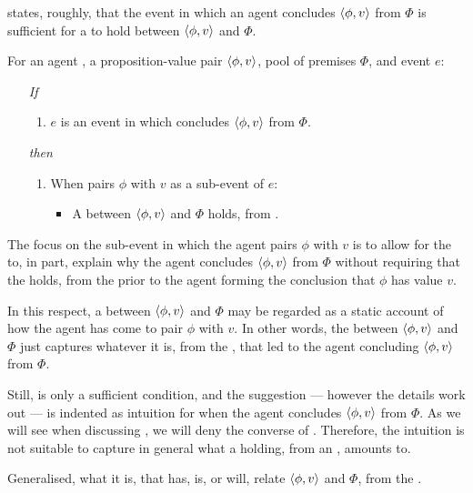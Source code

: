 \begin{note}
  \supportI{} states, roughly, that the event in which an agent concludes \(\langle \phi, v \rangle\) from \(\Phi\) is sufficient for a \ros{} to hold between \(\langle \phi, v \rangle\) and \(\Phi\).

  \begin{idea}[\supportI{}]
    \label{idea:support}
    For an agent \vAgent{}, a proposition-value pair \(\langle \phi, v \rangle\), pool of premises \(\Phi\), and event \(e\):

    \begin{itemize}
    \item[\emph{If}]
      \begin{enumerate}[label=\alph*., ref=(\alph*)]
      \item
        \(e\) is an event in which \vAgent{} concludes \(\langle \phi, v \rangle\) from \(\Phi\).
      \end{enumerate}
    \item[\emph{then}]
      \begin{enumerate}[label=\alph*., ref=(\alph*), resume]
      \item
        When \vAgent{} pairs \(\phi\) with \(v\) as a sub-event of \(e\):
        \begin{itemize}
        \item
          A \emph{\ros{}} between \(\langle \phi, v \rangle\) and \(\Phi\) holds, from .
        \end{itemize}
      \end{enumerate}
    \end{itemize}
    \vspace{-\baselineskip}
  \end{idea}

  The focus on the sub-event in which the agent pairs \(\phi\) with \(v\) is to allow for the \ros{} to, in part, explain why the agent concludes \(\langle \phi, v \rangle\) from \(\Phi\) without requiring that the \ros{} holds, from the \agpe{} prior to the agent forming the conclusion that \(\phi\) has value \(v\).

  In this respect, a \ros{} between \(\langle \phi, v \rangle\) and \(\Phi\) may be regarded as a static account of how the agent has come to pair \(\phi\) with \(v\).
  In other words, the \ros{} between \(\langle \phi, v \rangle\) and \(\Phi\) just captures whatever it is, from the \agpe{}, that led to the agent concluding \(\langle \phi, v \rangle\) from \(\Phi\).

  Still, \supportI{} is only a sufficient condition, and the suggestion --- however the details work out --- is indented as intuition for when the agent concludes \(\langle \phi, v \rangle\) from \(\Phi\).
  As we will see when discussing \supportII{}, we will deny the converse of \supportI{}.
  Therefore, the intuition is not suitable to capture in general what a \ros{} holding, from an \agpe{}, amounts to.

  Generalised, what it is, that has, is, or will, relate \(\langle \phi, v \rangle\) and \(\Phi\), from the \agpe{}.
\end{note}

